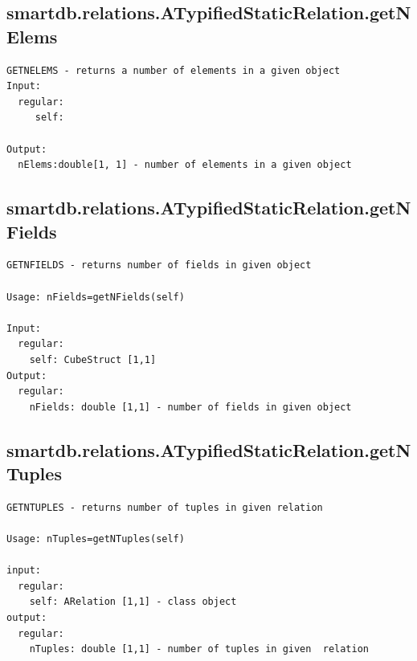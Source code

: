 \documentclass[letterpaper,10pt,english]{sphinxmanual}
\begin{document}
\subsection{smartdb.relations.ATypifiedStaticRelation.getNElems}
\label{chap_functions:smartdb-relations-atypifiedstaticrelation-getnelems}
\begin{Verbatim}[commandchars=\\\{\}]
GETNELEMS - returns a number of elements in a given object
Input:
  regular:
     self:

Output:
  nElems:double[1, 1] - number of elements in a given object
\end{Verbatim}


\subsection{smartdb.relations.ATypifiedStaticRelation.getNFields}
\label{chap_functions:smartdb-relations-atypifiedstaticrelation-getnfields}
\begin{Verbatim}[commandchars=\\\{\}]
GETNFIELDS - returns number of fields in given object

Usage: nFields=getNFields(self)

Input:
  regular:
    self: CubeStruct [1,1]
Output:
  regular:
    nFields: double [1,1] - number of fields in given object
\end{Verbatim}


\subsection{smartdb.relations.ATypifiedStaticRelation.getNTuples}
\label{chap_functions:smartdb-relations-atypifiedstaticrelation-getntuples}
\begin{Verbatim}[commandchars=\\\{\}]
GETNTUPLES - returns number of tuples in given relation

Usage: nTuples=getNTuples(self)

input:
  regular:
    self: ARelation [1,1] - class object
output:
  regular:
    nTuples: double [1,1] - number of tuples in given  relation
\end{Verbatim}
\end{document}
